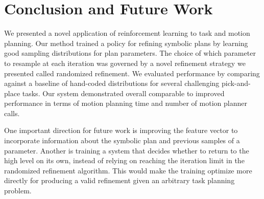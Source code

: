 \section{Conclusion and Future Work}
We presented a novel application of reinforcement learning to task
and motion planning. Our method trained a policy for refining symbolic plans
by learning good sampling distributions for plan parameters. The choice
of which parameter to resample at each iteration was governed by a novel
refinement strategy we presented called randomized refinement. We evaluated
performance by comparing against a baseline of hand-coded distributions
for several challenging pick-and-place tasks. Our system demonstrated overall comparable
to improved performance in terms of motion planning time and number of motion planner calls.

One important direction for future work is improving the feature vector to incorporate
information about the symbolic plan and previous samples of a parameter.
Another is training a system that decides
whether to return to the high level on its own, instead of relying on
reaching the iteration limit in the randomized refinement algorithm. This would
make the training optimize more directly for producing a valid refinement
given an arbitrary task planning problem.